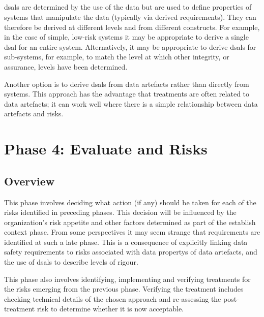 \subsection{}\label{bkm:activities:analyse:tailoring}
\glspl{dsal} are determined by the use of the data but are used to define properties of systems that manipulate the data (typically via derived requirements). They can therefore be derived at different levels and from different constructs. For example, in the case of simple, low-risk systems it may be appropriate to derive a single \gls{dsal} for an entire system. Alternatively, it may be appropriate to derive \glspl{dsal} for sub-systems, for example, to match the level at which other \gls{integrity}, or assurance, levels have been determined.

Another option is to derive \glspl{dsal} from \glspl{data artefact} rather than directly from systems. This approach has the advantage that \glspl{treatment} are often related to \glspl{data artefact}; it can work well where there is a simple relationship between \glspl{data artefact} and risks.

\section{Phase 4: Evaluate and  Risks}
\subsection{Overview}
This phase involves deciding what action (if any) should be taken for each of the risks identified in preceding phases. This decision will be influenced by the organization's risk appetite and other factors determined as part of the establish context phase. From some perspectives it may seem strange that requirements are identified at such a late phase. This is a consequence of explicitly linking data safety requirements to risks associated with \glspl{data property} of \glspl{data artefact}, and the use of \glspl{dsal} to describe levels of rigour. 

This phase also involves identifying, implementing and verifying \glspl{treatment} for the risks emerging from the previous phase. Verifying the \gls{treatment} includes checking technical details of the chosen approach and re-assessing the post-\gls{treatment} risk to determine whether it is now acceptable.

